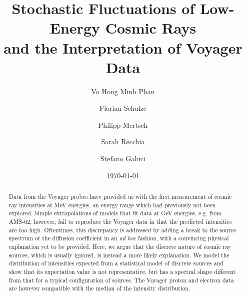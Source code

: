 \documentclass[%
reprint,
amsmath,amssymb,
aps,
superscriptaddress,
preprintnumbers
]{revtex4-2}
\begin{document}
\title{Stochastic Fluctuations of Low-Energy Cosmic Rays\\ and the Interpretation of Voyager Data}%

\author{Vo Hong Minh Phan}

\author{Florian Schulze}

\author{Philipp Mertsch}

\author{Sarah Recchia}

\author{Stefano Gabici}

\date{\today}


\begin{abstract}
Data from the Voyager probes have provided us with the first measurement of cosmic ray intensities at MeV energies, an energy range which had previously not been explored. 
Simple extrapolations of models that fit data at GeV energies, e.g. from AMS-02, however, fail to reproduce the Voyager data in that the predicted intensities are too high. 
Oftentimes, this discrepancy is addressed by adding a break to the source spectrum or the diffusion coefficient in an \textit{ad hoc} fashion, with a convincing physical explanation yet to be provided. 
Here, we argue that the discrete nature of cosmic ray sources, which is usually ignored, is instead a more likely explanation. 
We model the distribution of intensities expected from a statistical model of discrete sources and show that its expectation value is not representative, but has a spectral shape different from that for a typical configuration of sources.
The Voyager proton and electron data are however compatible with the median of the intensity distribution.
\end{abstract}
\end{document}
